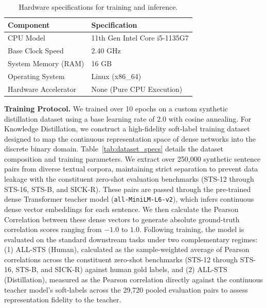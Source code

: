 \documentclass[11pt, conference, compsoc, twoside]{IEEEtran}
\begin{document}
\begin{table}[t]
\begin{center}
{\caption{Hardware specifications for training and inference.}\label{tab:hardware_specs}}


\begin{tabular}{ll}
\toprule
\textbf{Component} & \textbf{Specification} \\
\midrule
CPU Model & 11th Gen Intel Core i5-1135G7 \\
Base Clock Speed & 2.40 GHz \\
System Memory (RAM) & 16 GB \\
Operating System & Linux (x86\_64) \\
Hardware Accelerator & None (Pure CPU Execution) \\
\bottomrule
\end{tabular}
\end{center}
\end{table}

\textbf{Training Protocol.} We trained over 10 epochs on a custom synthetic distillation dataset using a base learning rate of $2.0$ with cosine annealing. For Knowledge Distillation, we construct a high-fidelity soft-label training dataset designed to map the continuous representation space of dense networks into the discrete binary domain. Table~\ref{tab:dataset_specs} details the dataset composition and training parameters. We extract over 250,000 synthetic sentence pairs from diverse textual corpora, maintaining strict separation to prevent data leakage with the constituent zero-shot evaluation benchmarks (STS-12 through STS-16, STS-B, and SICK-R). These pairs are passed through the pre-trained dense Transformer teacher model (\texttt{all-MiniLM-L6-v2}), which infers continuous dense vector embeddings for each sentence. We then calculate the Pearson Correlation between these dense vectors to generate absolute ground-truth correlation scores ranging from $-1.0$ to $1.0$. Following training, the model is evaluated on the standard downstream tasks under two complementary regimes: (1) ALL-STS (Human), calculated as the sample-weighted average of Pearson correlations across the constituent zero-shot benchmarks (STS-12 through STS-16, STS-B, and SICK-R) against human gold labels, and (2) ALL-STS (Distillation), measured as the Pearson correlation directly against the continuous teacher model's soft-labels across the 29,720 pooled evaluation pairs to assess representation fidelity to the teacher.
\end{document}
